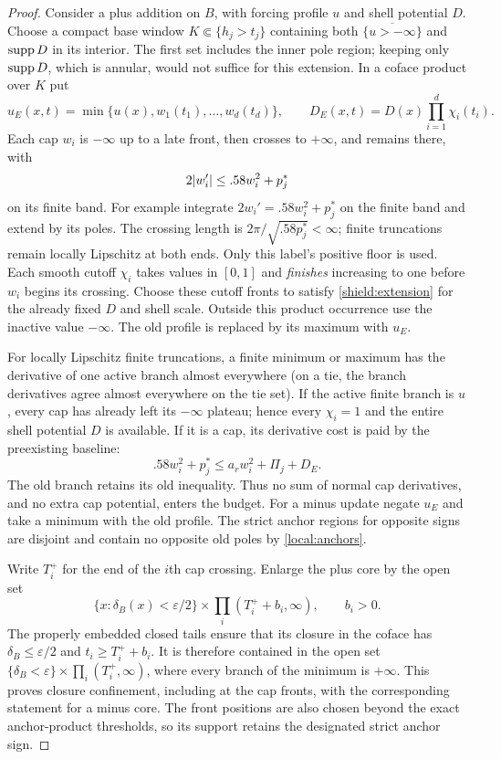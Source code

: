 \begin{proof}
Consider a plus addition on $B$, with forcing profile $u$ and shell
potential $D$.  Choose a compact base window $K\Subset\{h_j>t_j\}$
containing both $\overline{\{u> -\infty\}}$ and $\operatorname{supp} D$ in its
interior.  The first set includes the inner pole region; keeping only
$\operatorname{supp} D$, which is annular, would not suffice for this extension.
In a coface product over $K$ put
\begin{equation}\label{shield:cap-formula}
 u_E(x,t)=\min\{u(x),w_1(t_1),\ldots,w_d(t_d)\},\qquad
 D_E(x,t)=D(x)\prod_{i=1}^d\chi_i(t_i).
\end{equation}
Each cap $w_i$ is $-\infty$ up to a late front, then crosses to
$+\infty$, and remains there, with
\[
 2\lvert w_i'\rvert\le .58w_i^2+p_j^*
\]
on its finite band.  For example integrate $2w_i'=.58w_i^2+p_j^*$ on the finite
band and extend by its poles.  The crossing length is
$2\pi/\sqrt{.58p_j^*}<\infty$; finite truncations remain locally
Lipschitz at both ends.  Only this label's positive floor is used.
Each smooth cutoff $\chi_i$ takes values in
$[0,1]$ and \emph{finishes} increasing to one before $w_i$ begins its
crossing.  Choose these cutoff fronts to satisfy
\cref{shield:extension} for the already fixed $D$ and shell scale.
Outside this product occurrence use the inactive value $-\infty$.
The old profile is replaced by its maximum with $u_E$.

For locally Lipschitz finite truncations, a finite minimum or maximum
has the derivative of one active branch almost everywhere (on a tie,
the branch derivatives agree almost everywhere on the tie set).
If the active finite branch is $u$, every cap has already left its
$-\infty$ plateau; hence every $\chi_i=1$ and the entire shell
potential $D$ is available.  If it is a cap, its derivative cost is
paid by the preexisting baseline:
\[
 .58w_i^2+p_j^*\le a_rw_i^2+\Pi_j+D_E.
\]
The old branch retains its old inequality.  Thus no sum of normal
cap derivatives, and no extra cap potential, enters the budget.
For a minus update negate $u_E$ and take a minimum with the old profile.
The strict anchor regions for opposite signs are disjoint and contain
no opposite old poles by \cref{local:anchors}.

Write $T_i^+$ for the end of the $i$th cap crossing.  Enlarge the
plus core by the open set
\[
 \{x:\delta_B(x)<\varepsilon/2\}\times
       \prod_i(T_i^++b_i,\infty),\qquad b_i>0.
\]
The properly embedded closed tails ensure that its closure in the
coface has $\delta_B\le\varepsilon/2$ and $t_i\ge T_i^++b_i$.
It is therefore contained in the open set
$\{\delta_B<\varepsilon\}\times\prod_i(T_i^+,\infty)$, where every
branch of the minimum is $+\infty$.  This proves closure confinement,
including at the cap fronts, with the corresponding statement for a
minus core.  The front positions are also chosen beyond the exact anchor-product
thresholds, so its support retains the designated strict anchor sign.


\end{proof}
